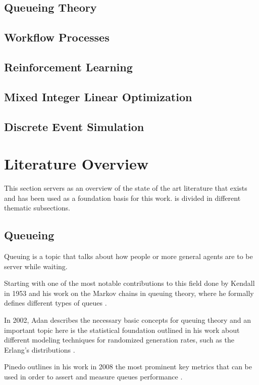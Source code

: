 \documentclass{seal_thesis}
\begin{document}
\subsection{Queueing Theory}
\subsection{Workflow Processes}
\subsection{Reinforcement Learning}
\subsection{Mixed Integer Linear Optimization}
\subsection{Discrete Event Simulation}
\section{Literature Overview}
\label{sec:literature_overview}

This section servers as an overview of the state of the art literature that exists and has been used as a foundation basis for this work.  is divided in different thematic subsections. 

\subsection{Queueing}

Queuing is a topic that talks about how people or more general agents are to be server while waiting. 

Starting with one of the most notable contributions to this field done by Kendall in 1953 and his work on the Markov chains in queuing theory, where he formally defines different types of queues \cite{Kendall1953}. 

In 2002, Adan describes the necessary basic concepts for queuing theory and an important topic here is the statistical foundation outlined in his work about different modeling techniques for randomized generation rates, such as the Erlang's distributions \cite{Adan2002}. 

Pinedo outlines in his work in 2008 the most prominent key metrics that can be used in order to assert and measure queues performance \cite{Pinedo2008}. 
\end{document}
